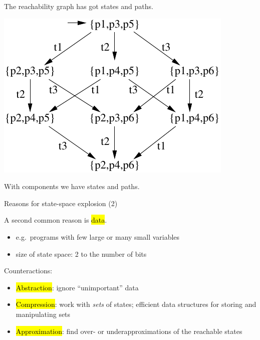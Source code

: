 \begin{frame}{}

The reachability graph has got  states and 
paths.

\bigskip
\begin{center}
\includegraphics[width=.8\textwidth]{content/chapter_model_checking/model_checking/images/3pkrip}
\end{center}

\bigskip
With  components we have  states and  paths.

\end{frame}


\begin{frame}{Reasons for state-space explosion (2)}

A second common reason is \hl{data}.
\begin{itemize}
  \item e.g.\ programs with few large or many small variables
  \item size of state space: 2 to the number of bits
\end{itemize}

\bigskip
Counteractions:
\begin{itemize}
\item \hl{Abstraction}: ignore ``unimportant'' data
\item \hl{Compression}: work with \emph{sets} of states;
  efficient data structures for storing and manipulating sets
\item \hl{Approximation}: find over- or underapproximations of the
  reachable states
\end{itemize}

\end{frame}

